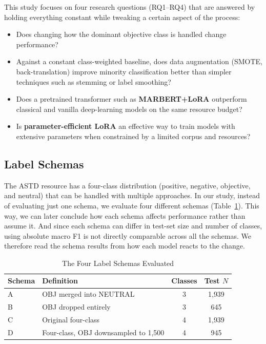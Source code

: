 \documentclass[conference]{IEEEtran}
\begin{document}
This study focuses on four research questions (RQ1--RQ4) that are answered
by holding everything constant while tweaking a certain aspect of the process:
\begin{itemize}
  \item[\textbf{RQ1}] Does changing how the dominant objective class is handled change performance? 
  \item[\textbf{RQ2}] Against a constant class-weighted baseline, does data augmentation
  (SMOTE, back-translation) improve minority classification better than simpler
  techniques such as stemming or label smoothing?
  \item[\textbf{RQ3}] Does a pretrained transformer such as \textbf{MARBERT+LoRA}
  outperform classical and vanilla deep-learning models on the same resource budget?   
  \item[\textbf{RQ4}] Is \textbf{parameter-efficient LoRA} an effective way to
        train models with extensive parameters when constrained by a limited corpus and resources?
\end{itemize}

\subsection{Label Schemas}
The ASTD resource has a four-class distribution (positive, negative, objective, and neutral)
that can be handled with multiple approaches. In our study, instead of evaluating just one
schema, we evaluate four different schemas (Table~\ref{tab:schemas}). This way, we can later conclude
how each schema affects performance rather than assume it. And since each schema
can differ in test-set size and number of classes, using absolute macro F1 is not directly
comparable across all the schemas. We therefore read the schema results from how each model reacts
to the change.

\begin{table}[h]
  \centering
  \caption{The Four Label Schemas Evaluated}
  \label{tab:schemas}
  \setlength{\tabcolsep}{3.5pt}
  \begin{tabular}{llcc}
    \toprule
    \textbf{Schema} & \textbf{Definition} & \textbf{Classes} & \textbf{Test $N$} \\
    \midrule
    A & OBJ merged into NEUTRAL            & 3 & 1{,}939 \\
    B & OBJ dropped entirely              & 3 & 645     \\
    C & Original four-class               & 4 & 1{,}939 \\
    D & Four-class, OBJ downsampled to 1{,}500 & 4 & 945 \\
    \bottomrule
  \end{tabular}
\end{table}
\end{document}

